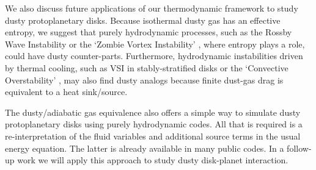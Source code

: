 We also discuss future applications of our thermodynamic framework to 
study dusty protoplanetary disks. Because isothermal dusty gas has an
effective entropy, we suggest that purely hydrodynamic processes, such
as the Rossby Wave Instability \citep{li00} or the `Zombie Vortex
Instability' \citep{marcus15}, where entropy plays a role, could have dusty counter-parts.   
Furthermore, hydrodynamic instabilities driven by thermal cooling, such as VSI in
stably-stratified disks \citep{lin15} or the `Convective
Overstability' \citep{klahr14, lyra14},  may also find dusty analogs 
because finite dust-gas drag is equivalent to a heat sink/source. 

The dusty/adiabatic gas equivalence also offers a simple way to simulate dusty protoplanetary disks 
using purely hydrodynamic codes. All that is required is a re-interpretation of the fluid variables and additional 
source terms in the usual energy equation. The latter is already available in many public codes. In a follow-up work
we will apply this approach to study dusty disk-planet interaction. 



 
